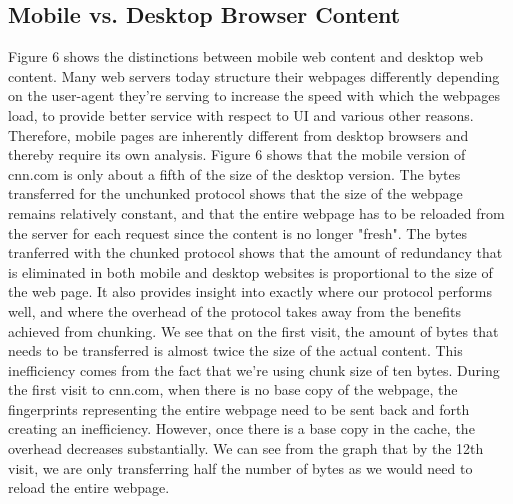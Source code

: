 \subsection{Mobile vs. Desktop Browser Content}
Figure 6 shows the distinctions between mobile web content and desktop web content. 
Many web servers today structure their webpages differently depending on the user-agent they're serving to increase the speed with which the webpages load, to provide better service with respect to UI and various other reasons. 
Therefore, mobile pages are inherently different from desktop browsers and thereby require its own analysis. 
Figure 6 shows that the mobile version of cnn.com is only about a fifth of the size of the desktop version. 
The bytes transferred for the unchunked protocol shows that the size of the webpage remains relatively constant, and that the entire webpage has to be reloaded from the server for each request since the content is no longer "fresh". 
The bytes tranferred with the chunked protocol shows that the amount of redundancy that is eliminated in both mobile and desktop websites is proportional to the size of the web page. 
It also provides insight into exactly where our protocol performs well, and where the overhead of the protocol takes away from the benefits achieved from chunking. 
We see that on the first visit, the amount of bytes that needs to be transferred is almost twice the size of the actual content. 
This inefficiency comes from the fact that we're using chunk size of ten bytes. 
During the first visit to cnn.com, when there is no base copy of the webpage, the fingerprints representing the entire webpage need to be sent back and forth creating an inefficiency. 
However, once there is a base copy in the cache, the overhead decreases substantially. 
We can see from the graph that by the 12th visit, we are only transferring half the number of bytes as we would need to reload the entire webpage. 

